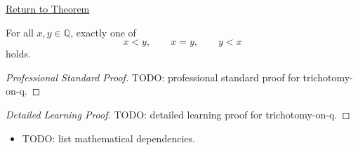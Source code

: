 \newpage
{}
\label{prf:trichotomy-on-q}

\begin{remark*}[Return]
\hyperref[thm:trichotomy-on-q]{Return to Theorem}
\end{remark*}

\begin{theorem*}[Trichotomy on $Q$]
For all $x,y\in\mathbb{Q}$, exactly one of
\[
x<y,\qquad x=y,\qquad y<x
\]
holds.
\end{theorem*}

\begin{proof}[Professional Standard Proof]
\LRAProofBodyStart
TODO: professional standard proof for trichotomy-on-q.
\end{proof}

\begin{proof}[Detailed Learning Proof]
\LRAProofBodyStart
TODO: detailed learning proof for trichotomy-on-q.
\end{proof}

\begin{remark*}
\end{remark*}

\begin{dependencies}
\begin{itemize}
  \item TODO: list mathematical dependencies.
\end{itemize}
\end{dependencies}

\clearpage
